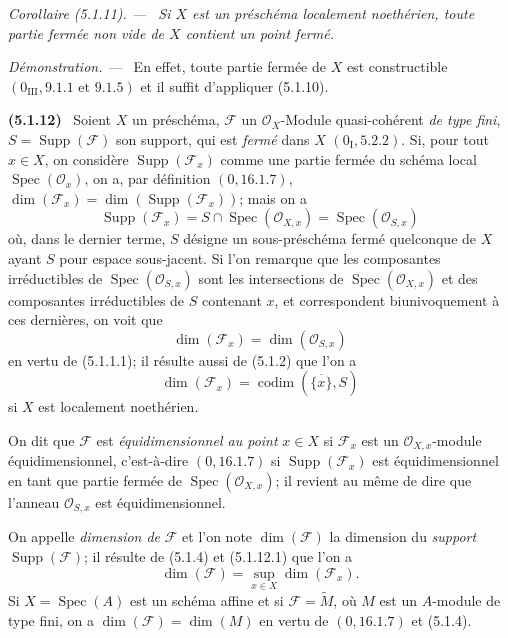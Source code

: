 \documentclass[10pt,oneside]{book}
\newenvironment{env}[1][]{\par\medskip\noindent\textbf{(#1)}\ }{\par}
\newenvironment{corollary}[1][]{%
  \par\medskip\noindent\itshape Corollaire (#1). ---\ }{\par}
\newenvironment{proof}{%
  \par\medskip\noindent\textit{Démonstration. ---\ }}{\par}
\begin{document}
\begin{corollary}[5.1.11]
\label{IV.2.5.1.11-fr}
Si $X$ est un préschéma localement noethérien, toute partie fermée non vide de
$X$ contient un point fermé.
\end{corollary}

\begin{proof}
En effet, toute partie fermée de $X$ est constructible
$(0_{\mathrm{III}},9.1.1\text{ et }9.1.5)$ et il suffit d'appliquer (5.1.10).
\end{proof}

\begin{env}[5.1.12]
\label{IV.2.5.1.12-fr}
Soient $X$ un préschéma, $\mathcal F$ un $\mathcal O_X$-Module
quasi-cohérent \emph{de type fini}, $S=\operatorname{Supp}(\mathcal F)$ son
support, qui est \emph{fermé} dans $X$ $(0_{\mathrm I},5.2.2)$. Si, pour tout
$x\in X$, on considère $\operatorname{Supp}(\mathcal F_x)$ comme une partie
fermée du schéma local $\operatorname{Spec}(\mathcal O_x)$, on a, par
définition $(0,16.1.7)$,
$\dim(\mathcal F_x)=\dim(\operatorname{Supp}(\mathcal F_x))$; mais on a
\[
\operatorname{Supp}(\mathcal F_x)
=S\cap\operatorname{Spec}(\mathcal O_{X,x})
=\operatorname{Spec}(\mathcal O_{S,x})
\]
où, dans le dernier terme, $S$ désigne un sous-préschéma fermé quelconque de
$X$ ayant $S$ pour espace sous-jacent. Si l'on remarque que les composantes
irréductibles de $\operatorname{Spec}(\mathcal O_{S,x})$ sont les
intersections de $\operatorname{Spec}(\mathcal O_{X,x})$ et des composantes
irréductibles de $S$ contenant $x$, et correspondent biunivoquement à ces
dernières, on voit que
\begin{equation}
\dim(\mathcal F_x)=\dim(\mathcal O_{S,x})
\tag{5.1.12.1}\label{IV.2.5.1.12.1-fr}
\end{equation}
en vertu de (5.1.1.1); il résulte aussi de (5.1.2) que l'on a
\begin{equation}
\dim(\mathcal F_x)=\operatorname{codim}(\overline{\{x\}},S)
\tag{5.1.12.2}\label{IV.2.5.1.12.2-fr}
\end{equation}
si $X$ est localement noethérien.

On dit que $\mathcal F$ est \emph{équidimensionnel au point} $x\in X$ si
$\mathcal F_x$ est un $\mathcal O_{X,x}$-module équidimensionnel,
c'est-à-dire $(0,16.1.7)$ si $\operatorname{Supp}(\mathcal F_x)$ est
équidimensionnel en tant que partie fermée de
$\operatorname{Spec}(\mathcal O_{X,x})$; il revient au même de dire que
l'anneau $\mathcal O_{S,x}$ est équidimensionnel.

On appelle \emph{dimension de} $\mathcal F$ et l'on note $\dim(\mathcal F)$
la dimension du \emph{support} $\operatorname{Supp}(\mathcal F)$; il résulte
de (5.1.4) et (5.1.12.1) que l'on a
\begin{equation}
\dim(\mathcal F)=\sup_{x\in X}\dim(\mathcal F_x).
\tag{5.1.12.3}\label{IV.2.5.1.12.3-fr}
\end{equation}
Si $X=\operatorname{Spec}(A)$ est un schéma affine et si
$\mathcal F=\widetilde M$, où $M$ est un $A$-module de type fini, on a
$\dim(\mathcal F)=\dim(M)$ en vertu de $(0,16.1.7)$ et (5.1.4).
\end{env}
\end{document}

